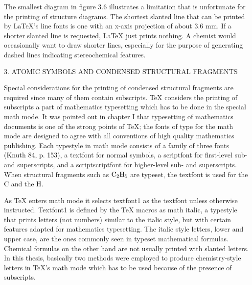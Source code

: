  \reinit
 The smallest diagram in figure 3.6 illustrates a limitation that
 is unfortunate for the printing of structure diagrams. The shortest
 slanted line that can be printed by LaTeX's line fonts is
 one with an x-axis projection of about 3.6 mm.
 If a shorter slanted line is requested, LaTeX just prints
 nothing. A chemist would occasionally want to draw shorter lines,
 especially for the purpose of generating dashed lines indicating
 stereochemical features.

 \vspace{0.4cm}   
 \centerline{3. ATOMIC SYMBOLS AND CONDENSED STRUCTURAL FRAGMENTS}
 \vspace{0.4cm}
 Special considerations for the printing of condensed structural
 fragments are required since many of them contain subscripts.
 TeX considers the printing of subscripts a part of mathematics 
 typesetting which has to be done in the special math mode.
 It was pointed out in chapter I that typesetting of mathematics
 documents is one of the strong points of TeX; the fonts of type 
 for the math mode are designed to agree with all conventions
 of high quality mathematics publishing. Each typestyle in math
 mode consists of a family of three fonts (Knuth 84, p. 153),
 a textfont for normal symbols, a scriptfont for first-level
 sub- and superscripts, and a scriptscriptfont for higher-level
 sub- and superscripts. When structural fragments such as
 ${\rm C_{2}H_{5}}$ are typeset, the textfont is used
 for the C and the H.

 As TeX enters math mode it selects textfont1 as the textfont
 unless otherwise instructed. Textfont1 is defined by the TeX
 macros as math italic, a typestyle that prints letters (not
 numbers) similar to the italic style, but with certain 
 features adapted for mathematics typesetting. The italic
 style letters, lower and upper case, are the ones commonly
 seen in typeset mathematical formulas. Chemical formulas
 on the other hand are not usually printed with slanted
 letters. In this thesis, basically two methods were employed
 to produce chemistry-style letters in TeX's math mode which
 has to be used because of the presence of subscripts.
 
